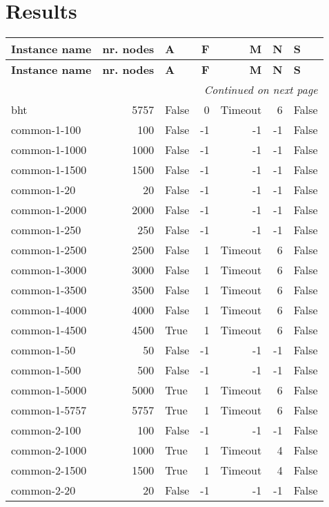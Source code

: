 \section{Results}
\begin{longtable}{lrlrrrl}\toprule \textbf{Instance name}& \textbf{nr. nodes}& \textbf{A}& \textbf{F}& \textbf{M}& \textbf{N}& \textbf{S}\\
\midrule
\endfirsthead
\toprule
 \textbf{Instance name}& \textbf{nr. nodes}& \textbf{A}& \textbf{F}& \textbf{M}& \textbf{N}& \textbf{S}\\
\midrule
\endhead
\midrule
\multicolumn{7}{r}{\textit{Continued on next page}} \\
\midrule
\endfoot
\bottomrule
\endlastfoot
bht & 5757 & False & 0 & Timeout & 6 & False \\
common-1-100 & 100 & False & -1 & -1 & -1 & False \\
common-1-1000 & 1000 & False & -1 & -1 & -1 & False \\
common-1-1500 & 1500 & False & -1 & -1 & -1 & False \\
common-1-20 & 20 & False & -1 & -1 & -1 & False \\
common-1-2000 & 2000 & False & -1 & -1 & -1 & False \\
common-1-250 & 250 & False & -1 & -1 & -1 & False \\
common-1-2500 & 2500 & False & 1 & Timeout & 6 & False \\
common-1-3000 & 3000 & False & 1 & Timeout & 6 & False \\
common-1-3500 & 3500 & False & 1 & Timeout & 6 & False \\
common-1-4000 & 4000 & False & 1 & Timeout & 6 & False \\
common-1-4500 & 4500 & True & 1 & Timeout & 6 & False \\
common-1-50 & 50 & False & -1 & -1 & -1 & False \\
common-1-500 & 500 & False & -1 & -1 & -1 & False \\
common-1-5000 & 5000 & True & 1 & Timeout & 6 & False \\
common-1-5757 & 5757 & True & 1 & Timeout & 6 & False \\
common-2-100 & 100 & False & -1 & -1 & -1 & False \\
common-2-1000 & 1000 & True & 1 & Timeout & 4 & False \\
common-2-1500 & 1500 & True & 1 & Timeout & 4 & False \\
common-2-20 & 20 & False & -1 & -1 & -1 & False \\

\end{longtable}
